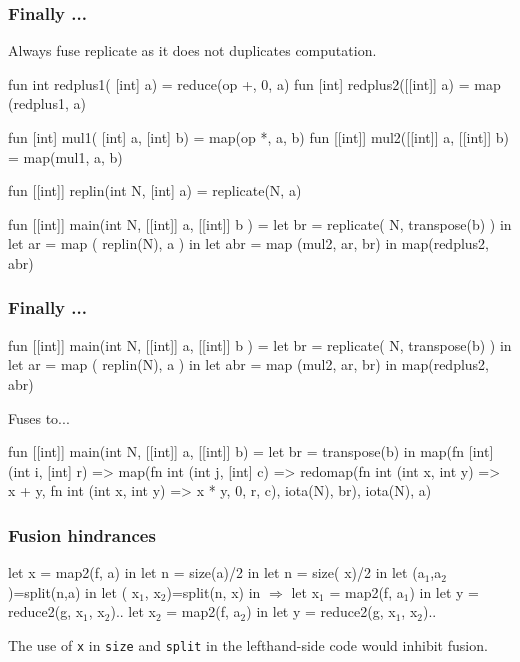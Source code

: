\documentclass{beamer}
\renewcommand{\emph}[1]{\textcolor{structure}{#1}}
\newcommand{\emp}[1]{\textcolor{DikuRed}{ #1}}
\newcommand{\emphh}[1]{\textcolor{CosGreen}{ #1}}
\newcommand{\mymath}[1]{$ #1 $}
\newcommand{\myindx}[1]{_{#1}}
\begin{document}
\begin{frame}[fragile,t]
  \frametitle{Finally ... }

  Always fuse \emph{replicate} as it does not duplicates computation.

  \bigskip

\begin{colorcode}
fun   int    redplus1( [int]  a) = reduce(op +, 0, a)
fun  [int]   redplus2([[int]] a) = map   (redplus1, a)

fun  [int]   mul1( [int]  a,  [int]  b) = map(op *, a, b)
fun [[int]]  mul2([[int]] a, [[int]] b) = map(mul1, a, b)

fun [[int]]  replin(int N, [int] a) = replicate(N, a)

fun [[int]] main(int N, [[int]] a, [[int]] b ) =
    let br  = replicate( N, transpose(b) ) in
    let ar  = map      ( replin(N),    a ) in
    let abr = map  (mul2, ar, br)          in
        map(redplus2, abr)
\end{colorcode}
\end{frame}

\begin{frame}[fragile,t]
  \frametitle{Finally ... }

\begin{colorcode}
fun [[int]] main(int N, [[int]] a, [[int]] b ) =
    let br  = replicate( N, transpose(b) ) in
    let ar  = map      ( replin(N),    a ) in
    let abr = map  (mul2, ar, br)      in
        map(redplus2, abr)
\end{colorcode}

Fuses to...

\begin{colorcode}
fun [[int]] main(int N, [[int]] a, [[int]] b) =
  let br = transpose(b) in
  map(fn [int] (int i, [int] r) =>
      map(fn int (int j, [int] c) =>
          redomap(fn int (int x, int y) => x + y,
                  fn int (int x, int y) => x * y,
                  0, r, c),
          iota(N), br),
      iota(N), a)
\end{colorcode}

\end{frame}

\begin{frame}[fragile, t]
\frametitle{Fusion hindrances}

\begin{colorcode}
let \emphh{x} = map2(f, a)      in    let n = size(a)/2      in
let n = size(\emp{x})/2       in    let (a\mymath{\myindx{1}},a\mymath{\myindx{2}})=split(n,a) in
let (\emphh{x\mymath{\myindx{1}}},\emphh{x\mymath{\myindx{2}}})=split(n,\emp{x})  in \mymath{\Rightarrow} let \emphh{x\mymath{\myindx{1}}} = map2(f, a\mymath{\myindx{1}})   in
let y = reduce2(g,\emphh{x\mymath{\myindx{1}}},\emphh{x\mymath{\myindx{2}}})..    let \emphh{x\mymath{\myindx{2}}} = map2(f, a\mymath{\myindx{2}})   in
                              let y = reduce2(g,\emphh{x\mymath{\myindx{1}}},\emphh{x\mymath{\myindx{2}}})..
\end{colorcode}
The use of {\tt x} in {\tt size} and {\tt split} in the lefthand-side
code would inhibit fusion.
\end{frame}
\end{document}
